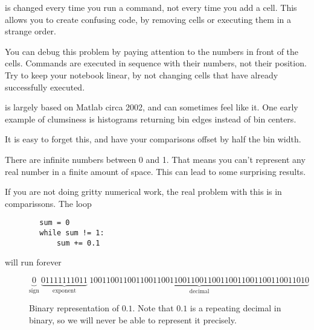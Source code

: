 \documentclass[justified, nobib]{tufte-handout}
\begin{document}
 is changed every time you run a command, not
every time you add a cell.
This allows you to create confusing code, by removing cells or executing them in a strange order.



\noindent
You can debug this problem by paying attention to the numbers in front of the cells.
Commands are executed in sequence with their numbers, not their position.
Try to keep your notebook linear, by not changing cells that have already successfully executed.

\pagebreak

 is largely based on Matlab circa 2002, and can sometimes feel like it. One early example of clumsiness is histograms returning bin edges instead of bin centers.



\noindent
It is easy to forget this, and have your comparisons  offset by half the bin width.

There are infinite numbers between 0 and 1.
That means you can't represent any real number in a finite amount of space.
This can lead to some surprising results.



\noindent
If you are not doing gritty numerical work, the real problem with this is in comparissons.
The loop
\begin{verbatim}
        sum = 0
        while sum != 1:
            sum += 0.1
\end{verbatim}

\noindent
will run forever

\begin{centering}
\begin{figure*}
$$\underbrace{0}_{\text{sign}} \: \underbrace{01111111011}_{\text{exponent}} \: \underbrace{1001100110011001100110011001100110011001100110011010}_{\text{decimal}}$$
\caption{Binary representation of $0.1$. Note that $0.1$ is a repeating decimal in binary, so we will never be able to represent it precisely.}
\end{figure*}
\end{centering}

\end{document}
